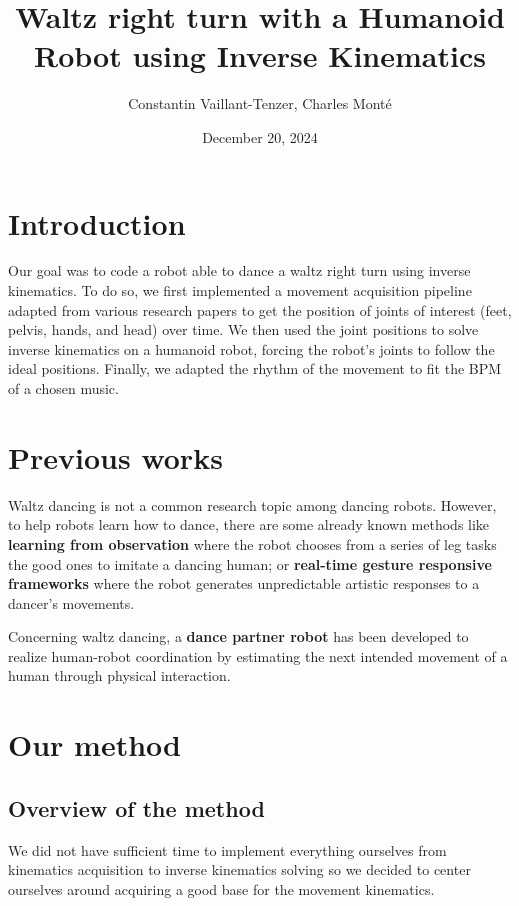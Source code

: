 \documentclass{amsart}
\date{December 20, 2024}
\title{Waltz right turn with a Humanoid Robot using Inverse Kinematics}
\author{Constantin Vaillant-Tenzer, Charles Monté}
\theoremstyle{definition}
\theoremstyle{plain}
\begin{document}
\maketitle


\section{Introduction}

Our goal was to code a robot able to dance a waltz right turn using inverse kinematics. To do so, we first implemented a movement acquisition pipeline adapted from various research papers to get the position of joints of interest (feet, pelvis, hands, and head) over time. We then used the joint positions to solve inverse kinematics on a humanoid robot, forcing the robot's joints to follow the ideal positions. Finally, we adapted the rhythm of the movement to fit the BPM of a chosen music.

\section{Previous works}
Waltz dancing is not a common research topic among dancing robots. However, to help robots learn how to dance, there are some already known methods like \textbf{learning from observation}\cite{traditional_jap_dance} where the robot chooses from a series of leg tasks the good ones to imitate a dancing human; or \textbf{real-time gesture responsive frameworks}\cite{spectacle_imitation} where the robot generates unpredictable artistic responses to a dancer's movements.

Concerning waltz dancing, a \textbf{dance partner robot}\cite{ballroom_dance} has been developed to realize human-robot coordination by estimating the next intended movement of a human through physical interaction.

\section{Our method}
\subsection{Overview of the method}
We did not have sufficient time to implement everything ourselves from kinematics acquisition to inverse kinematics solving so we decided to center ourselves around acquiring a good base for the movement kinematics. 
\\
\end{document}
